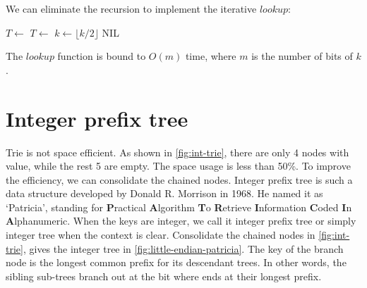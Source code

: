 \documentclass[b5paper]{article}
\begin{document}
We can eliminate the recursion to implement the iterative $lookup$:

\begin{algorithmic}[1]
      \State $T \gets$ 
    \Else
      \State $T \gets$ 
    \EndIf
    \State $k \gets \lfloor k/2 \rfloor$
  \EndWhile
    \State \Return {}
  \Else
    \State \Return NIL \EndIf
\EndFunction
\end{algorithmic}

The $lookup$ function is bound to $O(m)$ time, where $m$ is the number of bits of $k$.

\begin{Exercise}[label={ex:int-trie-empty-node}]
\end{Exercise}

\begin{Answer}[ref = {ex:int-trie-empty-node}]
\end{Answer}

\section{Integer prefix tree}
\label{int-patricia}  

Trie is not space efficient. As shown in \cref{fig:int-trie}, there are only 4 nodes with value, while the rest 5 are empty. The space usage is less than 50\%. To improve the efficiency, we can consolidate the chained nodes. Integer prefix tree is such a data structure developed by Donald R. Morrison in 1968. He named it as `Patricia', standing for \textbf{P}ractical \textbf{A}lgorithm \textbf{T}o \textbf{R}etrieve \textbf{I}nformation \textbf{C}oded \textbf{I}n \textbf{A}lphanumeric\cite{patricia-morrison}. When the keys are integer, we call it integer prefix tree or simply integer tree when the context is clear. Consolidate the chained nodes in \cref{fig:int-trie}, gives the integer tree in \cref{fig:little-endian-patricia}. The key of the branch node is the longest common prefix for its descendant trees. In other words, the sibling sub-trees branch out at the bit where ends at their longest prefix.
\end{document}
